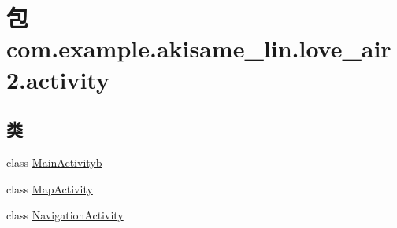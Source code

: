 \hypertarget{namespacecom_1_1example_1_1akisame__lin_1_1love__air2_1_1activity}{}\section{包 com.\+example.\+akisame\+\_\+lin.\+love\+\_\+air2.\+activity}
\label{namespacecom_1_1example_1_1akisame__lin_1_1love__air2_1_1activity}
\subsection*{类}
\begin{DoxyCompactItemize}
\item 
class \mbox{\hyperlink{classcom_1_1example_1_1akisame__lin_1_1love__air2_1_1activity_1_1_main_activityb}{Main\+Activityb}}
\item 
class \mbox{\hyperlink{classcom_1_1example_1_1akisame__lin_1_1love__air2_1_1activity_1_1_map_activity}{Map\+Activity}}
\item 
class \mbox{\hyperlink{classcom_1_1example_1_1akisame__lin_1_1love__air2_1_1activity_1_1_navigation_activity}{Navigation\+Activity}}
\end{DoxyCompactItemize}
